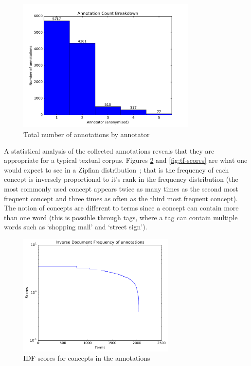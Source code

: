 \begin{figure}[h]
    \centering
    \includegraphics[width=0.8\textwidth]{graphs/annotator-breakdown}
    \caption{Total number of annotations by annotator}
    \label{fig:annotator-breakdown}
\end{figure}

A statistical analysis of the collected annotations reveals that they are appropriate for a typical textual corpus. Figures \ref{fig:idf-scores} and \ref{fig:tf-scores} are what one would expect to see in a Zipfian distribution~\cite{tullo2003modelling}; that is the frequency of each concept is inversely proportional to it's rank in the frequency distribution (the most commonly used concept appears twice as many times as the second most frequent concept and three times as often as the third most frequent concept). The notion of concepts are different to terms since a concept can contain more than one word (this is possible through tags, where a tag can contain multiple words such as `shopping mall' and `street sign').

\begin{figure}[b]
    \centering
    \includegraphics[width=0.7\textwidth]{graphs/idf-scores}
    \caption{IDF scores for concepts in the annotations}
    \label{fig:idf-scores}
\end{figure}

